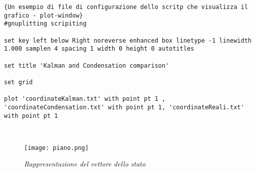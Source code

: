 \lstset{language=bash}
\lstset{commentstyle=\emph}
\begin{lstlisting}[frame=r,caption=Un esempio di file di configurazione dello scritp che visualizza il grafico - plot-window ,breaklines=true,basicstyle=\scriptsize]{Un esempio di file di configurazione dello scritp che visualizza il grafico - plot-window}
#gnuplitting scripiting

set key left below Right noreverse enhanced box linetype -1 linewidth 1.000 samplen 4 spacing 1 width 0 height 0 autotitles

set title 'Kalman and Condensation comparison'

set grid

plot 'coordinateKalman.txt' with point pt 1 , 'coordinateCondensation.txt' with point pt 1, 'coordinateReali.txt' with point pt 1



\end{lstlisting}

\begin{figure}[b]
\centering
	\texttt{[image: piano.png]}
\caption[Rappresentazione del vettore dello stato]{\textit{Rappresentazione del vettore dello stato}\label{fig:pianoStato}}
\end{figure}
